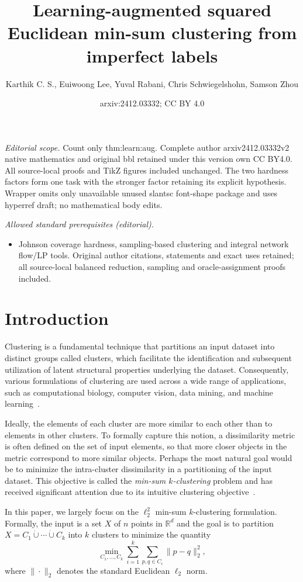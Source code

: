 \documentclass[10pt,a4paper]{amsart}
\title{Learning-augmented squared Euclidean min-sum clustering from imperfect labels}
\author{Karthik C. S., Euiwoong Lee, Yuval Rabani, Chris Schwiegelshohn, Samson Zhou}
\date{arxiv:2412.03332; CC BY 4.0}
\begin{document}
\maketitle
\noindent\textit{Editorial scope.} Count only thm:learn:aug. Complete author arxiv2412.03332v2 native mathematics and original bbl retained under this version own CC BY4.0. All source-local proofs and TikZ figures included unchanged. The two hardness factors form one task with the stronger factor retaining its explicit hypothesis. Wrapper omits only unavailable unused slantsc font-shape package and uses hyperref draft; no mathematical body edits.\par\medskip
\noindent\textit{Allowed standard prerequisites (editorial).}\begin{itemize}
\item Johnson coverage hardness, sampling-based clustering and integral network flow/LP tools. Original author citations, statements and exact uses retained; all source-local balanced reduction, sampling and oracle-assignment proofs included.
\end{itemize}\medskip
\section{Introduction}
Clustering is a fundamental technique that partitions an input dataset into distinct groups called clusters, which facilitate the identification and subsequent utilization of latent structural properties underlying the dataset. 
Consequently, various formulations of clustering are used across a wide range of applications, such as computational biology, computer vision, data mining, and machine learning~\cite{jain1999data,xu2005survey}. 

Ideally, the elements of each cluster are more similar to each other than to elements in other clusters. 
To formally capture this notion, a dissimilarity metric is often defined on the set of input elements, so that more closer objects in the metric correspond to more similar objects. 
Perhaps the most natural goal would be to minimize the intra-cluster dissimilarity in a partitioning of the input dataset. 
This objective is called the \emph{min-sum $k$-clustering} problem and has received significant attention due to its intuitive clustering objective~\cite{Guttmann-BeckH98a,Indyk99,Matousek00,Schulman00,BartalCR01,VegaKKR03,CzumajS07,AloiseDHP09,BehsazFSS19,BanerjeeOR21,Cohen-AddadSL21}. 

In this paper, we largely focus on the $\ell_2^2$ min-sum $k$-clustering formulation. 
Formally, the input is a set $X$ of $n$ points in $\mathbb{R}^d$ and the goal is to partition $X=C_1\dot\cup\cdots\dot\cup C_k$ into $k$ clusters to minimize the quantity
\[\min_{C_1,\ldots,C_k}\sum_{i=1}^k\sum_{p,q\in C_i}\|p-q\|_2^2,\]
where $\|\cdot\|_2$ denotes the standard Euclidean $\ell_2$ norm. 
\end{document}
